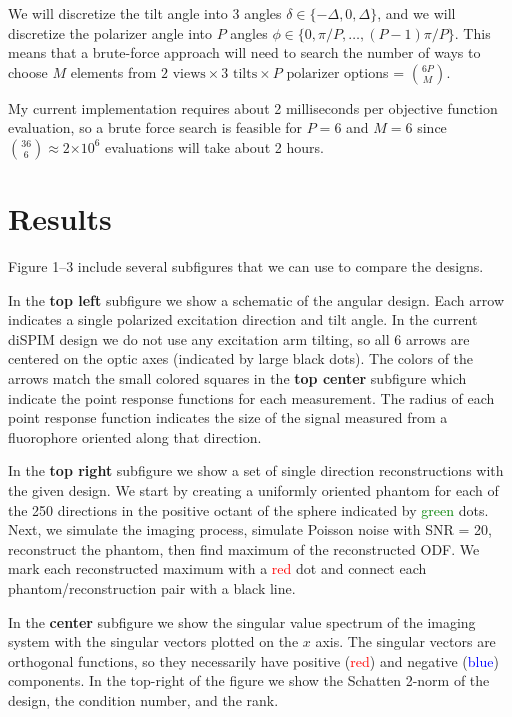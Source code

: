 \documentclass[11pt]{article}
\providecommand{\e}[1]{\ensuremath{\times 10^{#1}}}
\begin{document}
We will discretize the tilt angle into 3 angles
$\delta \in \{-\Delta, 0, \Delta\}$, and we will discretize the polarizer angle
into $P$ angles $\phi \in \{0,\pi/P,\dots,(P-1)\pi/P\}$. This means that a
brute-force approach will need to search the number of ways to choose $M$
elements from $2\,\,\text{views}\times 3\,\,\text{tilts}\times P\,\,\text{polarizer}$
options = $\binom{6P}{M}$.

My current implementation requires about 2 milliseconds per objective function
evaluation, so a brute force search is feasible for $P=6$ and $M=6$ since
$\binom{36}{6} \approx 2\e{6}$ evaluations will take about 2 hours.

\section{Results}\label{sec:results}
Figure 1--3 include several subfigures that we can use to compare the designs.

In the \textbf{top left} subfigure we show a schematic of the angular design.
Each arrow indicates a single polarized excitation direction and tilt angle. In
the current diSPIM design we do not use any excitation arm tilting, so all 6
arrows are centered on the optic axes (indicated by large black dots). The
colors of the arrows match the small colored squares in the \textbf{top center}
subfigure which indicate the point response functions for each measurement. The
radius of each point response function indicates the size of the signal measured
from a fluorophore oriented along that direction.

In the \textbf{top right} subfigure we show a set of single direction
reconstructions with the given design. We start by creating a uniformly oriented
phantom for each of the 250 directions in the positive octant of the sphere
indicated by \textcolor{green}{green} dots. Next, we simulate the imaging
process, simulate Poisson noise with SNR = 20, reconstruct the phantom, then
find maximum of the reconstructed ODF. We mark each reconstructed maximum with a
\textcolor{red}{red} dot and connect each phantom/reconstruction pair with a
black line.

In the \textbf{center} subfigure we show the singular value spectrum of the
imaging system with the singular vectors plotted on the $x$ axis. The singular
vectors are orthogonal functions, so they necessarily have positive
(\textcolor{red}{red}) and negative (\textcolor{blue}{blue}) components. In the
top-right of the figure we show the Schatten 2-norm of the design, the condition
number, and the rank.
\end{document}
